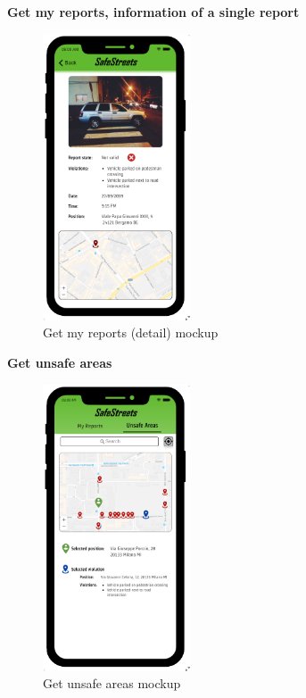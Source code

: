 					\clearpage
					\begin{center}
						{\small \textbf{Get my reports, information of a single report}}
					\end{center}
					\vspace{-5mm}
					\begin{figure}[!h]
						\centering
						\includegraphics[height=8.5cm]{images/MockUp/User/MyReportExpanded.pdf}
						\caption{Get my reports (detail) mockup}
					\end{figure}
					\vspace{-1mm}
					\begin{center}
						{\small \textbf{Get unsafe areas}}
					\end{center}
					\vspace{-5mm}
					\begin{figure}[!h]
						\centering
						\includegraphics[height=8.5cm]{images/MockUp/User/UnsafeAreas.pdf}
						\caption{Get unsafe areas mockup}
					\end{figure}
